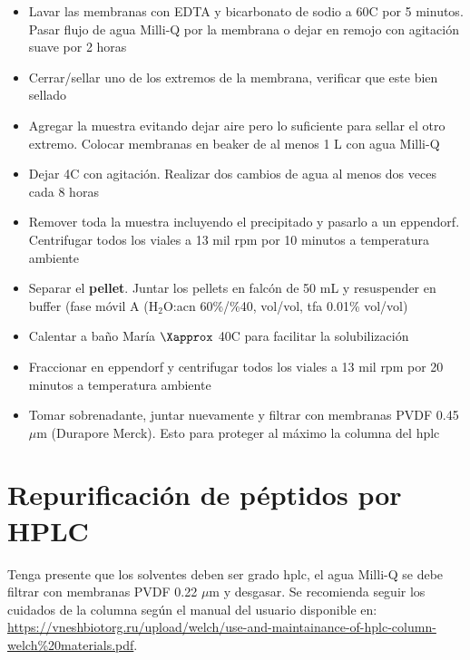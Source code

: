 \begin{appendix}
\begin{itemize}
        \item{Lavar las membranas con EDTA y bicarbonato de sodio a 60\textdegree C por 5 minutos. Pasar flujo de agua Milli-Q por la membrana o dejar en remojo con agitación suave por 2 horas}
        \item{Cerrar/sellar uno de los extremos de la membrana, verificar que este bien sellado}
        \item{Agregar la muestra evitando dejar aire pero lo suficiente para sellar el otro extremo. Colocar membranas en beaker de al menos 1 L con agua Milli-Q}
        \item{Dejar 4\textdegree C con agitación. Realizar dos cambios de agua al menos dos veces cada 8 horas}
        \item{Remover toda la muestra incluyendo el precipitado y pasarlo a un eppendorf. Centrifugar todos los viales a 13 mil \ac{rpm} por 10 minutos a temperatura ambiente}
        \item{Separar el \textbf{pellet}. Juntar los pellets en falcón de 50 mL y resuspender en buffer (fase móvil A (H$_{2}$O:\ac{acn} 60\%/\%40, vol/vol, \ac{tfa} 0.01\% vol/vol)}
        \item{Calentar a baño María $\Xapprox$ 40\textdegree C para facilitar la solubilización}
        \item{Fraccionar en eppendorf y centrifugar todos los viales a 13 mil \ac{rpm} por 20 minutos a temperatura ambiente}
        \item{Tomar sobrenadante, juntar nuevamente y filtrar con membranas PVDF 0.45 $\mu$m (Durapore Merck). Esto para proteger al máximo la columna del \ac{hplc}}   
\end{itemize}

\section{Repurificación de péptidos por HPLC}\label{Protocolo_HPLC}

Tenga presente que los solventes deben ser grado \ac{hplc}, el agua Milli-Q se debe filtrar con membranas PVDF 0.22 $\mu$m y desgasar. Se recomienda seguir los cuidados de la columna según el manual del usuario disponible en: \url{https://vneshbiotorg.ru/upload/welch/use-and-maintainance-of-hplc-column-welch%20materials.pdf}.


\end{appendix}
